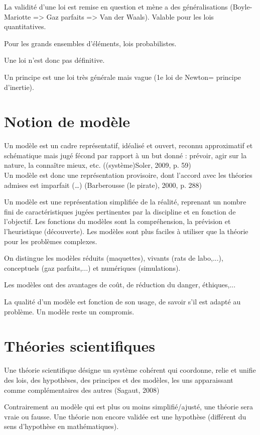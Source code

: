 \documentclass{report}
\begin{document}
	La validité d'une loi est remise en question et mène a des généralisations (Boyle-Mariotte  => Gaz parfaits => Van der Waals). Valable pour les lois quantitatives.
	
	Pour les grands ensembles d'éléments, lois probabilistes.
	
	Une loi n'est donc pas définitive.
	
	Un principe est une loi très générale mais vague (1e loi de Newton= principe d'inertie).
	
	\section{Notion de modèle}
	
	Un modèle est \og un cadre représentatif, idéalisé et ouvert, reconnu approximatif et schématique mais jugé fécond par rapport à un but donné : prévoir, agir sur la nature, la connaître mieux, etc. \fg ((système)Soler, 2009, p. 59)\\
	Un modèle est donc une \og représentation provisoire, dont l’accord avec les théories admises est imparfait (…) \fg (Barberousse (le pirate), 2000, p. 288)
	
	Un modèle est une représentation simplifiée de la réalité, reprenant un nombre fini de caractéristiques jugées pertinentes par la discipline et en fonction de l'objectif. Les fonctions du modèles sont la compréhension, la prévision et l'heuristique (découverte). Les modèles sont plus faciles à utiliser que la théorie pour les problèmes complexes.
	
	On distingue les modèles réduits (maquettes), vivants (rats de labo,...), conceptuels (gaz parfaits,...) et numériques (simulations).
	
	Les modèles ont des avantages de coût, de réduction du danger, éthiques,...
	
	La qualité d'un modèle est fonction de son usage, de savoir s'il est adapté au problème. Un modèle reste un compromis.
	
	\section{Théories scientifiques}
	
	Une théorie scientifique désigne \og un système cohérent qui coordonne, relie et unifie des lois, des hypothèses, des principes et des modèles, les uns apparaissant comme complémentaires des autres \fg (Sagaut, 2008)
	
	Contrairement au modèle qui est plus ou moins simplifié/ajusté, une théorie sera vraie ou fausse. Une théorie non encore validée est une hypothèse (différent du sens d'hypothèse en mathématiques).
	
\end{document}
